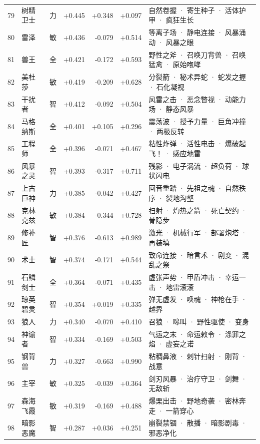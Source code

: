 \documentclass[10pt,a4paper]{article}
\begin{document}
{\begin{longtable}{@{}rlcrrrp{7.6cm}@{}}
79 & 树精卫士 & 力 & +0.445 & +0.348 & +0.097 & \small 自然卷握 · 寄生种子 · 活体护甲 · 疯狂生长 \\
80 & 雷泽 & 敏 & +0.436 & -0.079 & +0.514 & \small 等离子场 · 静电连接 · 风暴涌动 · 风暴之眼 \\
81 & 兽王 & 全 & +0.421 & -0.172 & +0.593 & \small 野性之斧 · 召唤刀背兽 · 召唤猛禽 · 原始咆哮 \\
82 & 美杜莎 & 敏 & +0.419 & -0.209 & +0.628 & \small 分裂箭 · 秘术异蛇 · 蛇发之握 · 石化凝视 \\
83 & 干扰者 & 智 & +0.412 & -0.092 & +0.504 & \small 风雷之击 · 恶念瞥视 · 动能力场 · 静态风暴 \\
84 & 马格纳斯 & 全 & +0.401 & +0.105 & +0.296 & \small 震荡波 · 授予力量 · 巨角冲撞 · 两极反转 \\
85 & 工程师 & 全 & +0.396 & -0.071 & +0.467 & \small 粘性炸弹 · 活性电击 · 爆破起飞！ · 感应地雷 \\
86 & 风暴之灵 & 智 & +0.393 & -0.317 & +0.711 & \small 残影 · 电子涡流 · 超负荷 · 球状闪电 \\
87 & 上古巨神 & 力 & +0.385 & -0.042 & +0.427 & \small 回音重踏 · 先祖之魂 · 自然秩序 · 裂地沟壑 \\
88 & 克林克兹 & 敏 & +0.384 & -0.344 & +0.728 & \small 扫射 · 灼热之箭 · 死亡契约 · 骨隐步 \\
89 & 修补匠 & 智 & +0.376 & -0.613 & +0.989 & \small 激光 · 机械行军 · 部署炮塔 · 再装填 \\
90 & 术士 & 智 & +0.374 & -0.171 & +0.544 & \small 致命连接 · 暗言术 · 剧变 · 混乱之祭 \\
91 & 石鳞剑士 & 全 & +0.364 & -0.071 & +0.435 & \small 虚张声势 · 甲盾冲击 · 幸运一击 · 地雷滚滚 \\
92 & 琼英碧灵 & 智 & +0.354 & +0.019 & +0.335 & \small 弹无虚发 · 唤魂 · 神枪在手 · 越界 \\
93 & 狼人 & 力 & +0.340 & -0.070 & +0.410 & \small 召狼 · 嗥叫 · 野性驱使 · 变身 \\
94 & 神谕者 & 智 & +0.334 & -0.169 & +0.503 & \small 气运之末 · 命运敕令 · 涤罪之焰 · 虚妄之诺 \\
95 & 钢背兽 & 力 & +0.327 & -0.663 & +0.990 & \small 粘稠鼻液 · 刺针扫射 · 刚背 · 战意 \\
96 & 主宰 & 敏 & +0.325 & -0.039 & +0.364 & \small 剑刃风暴 · 治疗守卫 · 剑舞 · 无敌斩 \\
97 & 森海飞霞 & 敏 & +0.319 & -0.169 & +0.488 & \small 爆栗出击 · 野地奇袭 · 密林奔走 · 一箭穿心 \\
98 & 暗影恶魔 & 智 & +0.287 & +0.036 & +0.251 & \small 崩裂禁锢 · 散播 · 暗影剧毒 · 邪恶净化 \\

\end{longtable}}
\end{document}
